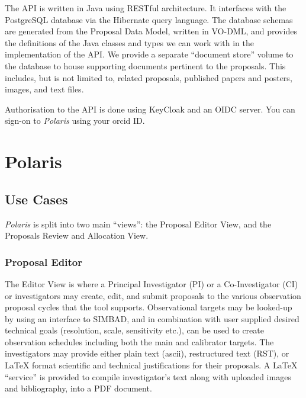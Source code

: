 \documentclass[11pt,twoside]{article}
\begin{document}
The API is written in Java using RESTful architecture.
It interfaces with the PostgreSQL database via the Hibernate query language.
The database schemas are generated from the Proposal Data Model, written in VO-DML, and provides the
definitions of the Java classes and types we can work with in the implementation of the API\@.
We provide a separate ``document store'' volume to the database to house supporting documents pertinent
to the proposals.
This includes, but is not limited to, related proposals, published papers and posters, images, and text
files.

Authorisation to the API is done using KeyCloak and an OIDC server.
You can sign-on to \emph{Polaris} using your orcid ID\@.


\section{Polaris}\label{sec:polaris}

\subsection{Use Cases}\label{subsec:use-cases}

\emph{Polaris} is split into two main ``views'': the Proposal Editor View, and the Proposals Review
and Allocation View.


\subsubsection{Proposal Editor}\label{subsubsec:proposal-editor}


The Editor View is where a Principal Investigator (PI) or a Co-Investigator (CI) or investigators may create,
edit, and submit proposals to the various observation proposal cycles that the tool supports.
Observational targets may be looked-up by using an interface to SIMBAD, and in combination with user
supplied desired technical goals (resolution, scale, sensitivity etc.), can be used to create observation
schedules including both the main and calibrator targets.
The investigators may provide either plain text (ascii), restructured text (RST), or LaTeX format scientific
and technical justifications for their proposals.
A LaTeX ``service'' is provided to compile investigator's text along with uploaded images and bibliography,
into a PDF document.
\end{document}
